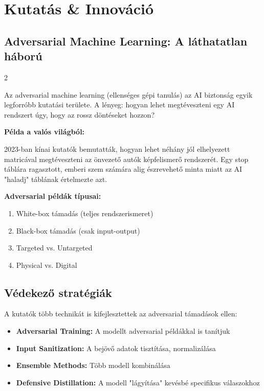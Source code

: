 \documentclass{../templates/magazine}
\begin{document}
\newpage

\section{Kutatás \& Innováció}

\subsection{Adversarial Machine Learning: A láthatatlan háború}

\begin{multicols}{2}

Az adversarial machine learning (ellenséges gépi tanulás) az AI biztonság egyik legforróbb kutatási területe. A lényeg: hogyan lehet megtéveszteni egy AI rendszert úgy, hogy az rossz döntéseket hozzon?

\textbf{Példa a valós világból:}

2023-ban kínai kutatók bemutatták, hogyan lehet néhány jól elhelyezett matricával megtéveszteni az önvezető autók képfelismerő rendszerét. Egy stop táblára ragasztott, emberi szem számára alig észrevehető minta miatt az AI "haladj" táblának értelmezte azt.

\columnbreak

\begin{warningbox}
\textbf{Adversarial példák típusai:}
\begin{enumerate}
    \item White-box támadás (teljes rendszerismeret)
    \item Black-box támadás (csak input-output)
    \item Targeted vs. Untargeted
    \item Physical vs. Digital
\end{enumerate}
\end{warningbox}

\end{multicols}

\subsection{Védekező stratégiák}

A kutatók több technikát is kifejlesztettek az adversarial támadások ellen:

\begin{itemize}
    \item \textbf{Adversarial Training:} A modellt adversarial példákkal is tanítjuk
    \item \textbf{Input Sanitization:} A bejövő adatok tisztítása, normalizálása
    \item \textbf{Ensemble Methods:} Több modell kombinálása
    \item \textbf{Defensive Distillation:} A modell "lágyítása" kevésbé specifikus válaszokhoz
\end{itemize}
\end{document}
